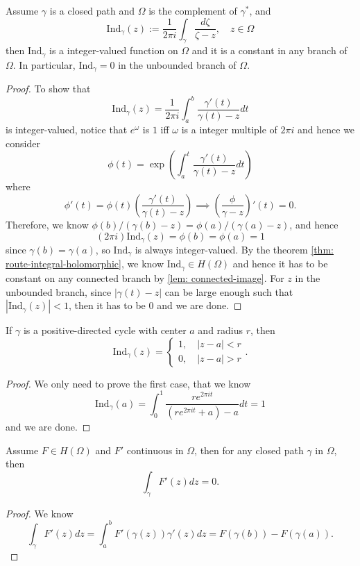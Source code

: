 \begin{theorem}
\label{thm: cauchy-index-thm}
    Assume $\gamma$ is a closed path and $\Omega$ is the complement of $\gamma^*$, and 
    \[
    \text{Ind}_{\gamma}(z):= \dfrac{1}{2\pi i}\int_{\gamma}\dfrac{d\zeta}{\zeta - z},\quad z\in \Omega
    \]
    then $\text{Ind}_{\gamma}$ is a integer-valued function on $\Omega$ and it is a constant in any branch of $\Omega$. In particular, $\text{Ind}_{\gamma} = 0$ in the unbounded branch of $\Omega$.
\end{theorem}
\begin{proof}
    To show that
    \[
    \text{Ind}_{\gamma}(z) = \dfrac{1}{2\pi i}\int_a^b \dfrac{\gamma'(t)}{\gamma(t)-z}dt
    \]
    is integer-valued, notice that $e^{\omega}$ is $1$ iff $\omega$ is a integer multiple of $2\pi i$ and hence we consider
    \[
    \phi(t) = \exp\left(\int_a^t \dfrac{\gamma'(t)}{\gamma(t)-z}dt\right)
    \]
    where
    \[
    \phi'(t) = \phi(t)\left(\dfrac{\gamma'(t)}{\gamma(t)-z}\right) \implies \left(\dfrac{\phi}{\gamma-z}\right)'(t) = 0 .
    \]
    Therefore, we know $\phi(b)/(\gamma(b)-z) = \phi(a)/(\gamma(a) - z)$, and hence
    \[
    (2\pi i) \text{Ind}_{\gamma}(z) = \phi(b) = \phi(a) = 1
    \]
    since $\gamma(b) = \gamma(a)$, so $\text{Ind}_{\gamma}$ is always integer-valued. By the theorem \ref{thm: route-integral-holomorphic}, we know $\text{Ind}_{\gamma} \in H(\Omega)$ and hence it has to be constant on any connected branch by \ref{lem: connected-image}. For $z$ in the unbounded branch, since $|\gamma(t) - z|$ can be large enough such that $|\text{Ind}_{\gamma}(z)| < 1$, then it has to be $0$ and we are done. 
\end{proof}

\begin{proposition}
    If $\gamma$ is a positive-directed cycle with center $a$ and radius $r$, then
    \[
    \text{Ind}_{\gamma}(z) = \begin{cases}
        1,\quad |z-a| < r \\
        0,\quad |z-a| > r
    \end{cases}.
    \]
\end{proposition}
\begin{proof}
    We only need to prove the first case, that we know
    \[
    \text{Ind}_{\gamma}(a) = \int_0^{1} \dfrac{re^{2\pi i t}}{(re^{2\pi i t} +a) - a} dt =1 
    \]
    and we are done.
\end{proof}

\begin{theorem}
    Assume $F \in H(\Omega)$ and $F'$ continuous in $\Omega$, then for any closed path $\gamma$ in $\Omega$, then
    \[\int_{\gamma} F'(z)dz = 0.\]
\end{theorem}
\begin{proof}
    We know
    \[
    \int_{\gamma} F'(z)dz = \int_a^b F'(\gamma(z))\gamma'(z)dz = F(\gamma(b)) - F(\gamma(a)).
    \]
\end{proof}

